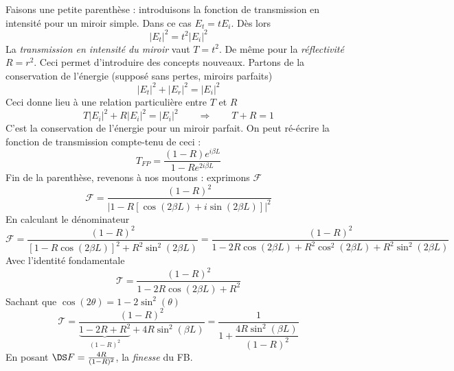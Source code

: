 Faisons une petite parenthèse : introduisons la fonction de transmission en intensité pour 
un miroir simple. Dans ce cas $E_t = tE_i$. Dès lors
\begin{equation}
|E_t|^2 = t^2|E_i|^2
\end{equation}
La \textit{transmission en intensité du miroir} vaut $T=t^2$. De même pour la \textit{réflectivité} 
$R=r^2$. Ceci permet d'introduire des concepts nouveaux. Partons de la conservation de l’énergie 
(supposé sans pertes, miroirs parfaits)
\begin{equation}
|E_t|^2+|E_r|^2=|E_i|^2
\end{equation}
Ceci donne lieu à une relation particulière entre $T$ et $R$
\begin{equation}
T|E_i|^2+R|E_i|^2 = |E_i|^2\qquad\Longrightarrow\qquad T+R=1
\end{equation}
C'est la conservation de l'énergie pour un miroir parfait. On peut ré-écrire la fonction de 
transmission compte-tenu de ceci :
\begin{equation}
T_{FP} = \dfrac{(1-R)e^{i\beta L}}{1-Re^{2i\beta L}}
\end{equation}
Fin de la parenthèse, revenons à nos moutons : exprimons $\mathcal{F}$ 
\begin{equation}
\mathcal{F} = \dfrac{(1-R)^2}{|1-R[\cos(2\beta L)+i\sin(2\beta L)]|^2}
\end{equation}
En calculant le dénominateur
\begin{equation}
\mathcal{F} = \dfrac{(1-R)^2}{[1-R\cos(2\beta L)]^2+R^2\sin^2(2\beta L)} = \dfrac{(1-R)^2}{
1-2R\cos(2\beta L)+R^2\cos^2(2\beta L)+R^2\sin^2(2\beta L)}
\end{equation}
Avec l'identité fondamentale
\begin{equation}
\mathcal{T} = \dfrac{(1-R)^2}{1-2R\cos(2\beta L)+R^2}
\end{equation}
Sachant que $\cos(2\theta) = 1-2\sin^2(\theta)$
\begin{equation}
\mathcal{T} = \dfrac{(1-R)^2}{\underbrace{1-2R+R^2}_{(1-R)^2}+4R\sin^2(\beta L)} = 
\dfrac{1}{1+\dfrac{4R\sin^2(\beta L)}{(1-R)^2}}
\end{equation}
En posant $\DS F=\frac{4R}{(1-R)^2}$, la \textit{finesse} du FB.


\ \\


